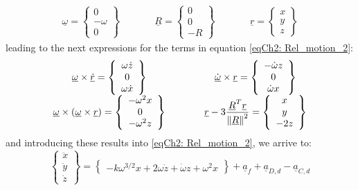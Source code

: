 	\[\begin{array}{ccccc}
	\underline{\omega} = 
	\left\{ \begin{array}{c}
	0 \\
	-\omega \\
	0
	\end{array}\right\} 
	& \qquad &
	\underline{R} = 
	\left\{ \begin{array}{c}
	0 \\
	0 \\
	-R
	\end{array}\right\} 
	& \qquad &
	\underline{r} = 
	\left\{ \begin{array}{c}
	x \\
	y \\
	z
	\end{array}\right\} 
	\end{array}
	\]
	\noindent leading to the next expressions for the terms in equation \eqref{eqCh2: 	Rel_motion_2}:
	\[\begin{array}{ccccc}
	\underline{\omega}\times \underline{\dot{r}} = 
	\left\{ \begin{array}{c}
	\omega \dot{z} \\
	0 \\
	\omega \dot{x}
	\end{array}\right\} 
	& \qquad &
	\underline{\dot{\omega}} \times \underline{r} = 
	\left\{ \begin{array}{c}
	-\dot{\omega} z\\
	0 \\
	\dot{\omega} x
	\end{array}\right\} 
	\\
	\underline{\omega}\times\left(\underline{\omega} \times\underline{r}\right) = 
	\left\{ \begin{array}{c}
	- \omega^2 x \\
	0 \\
	- \omega^2 z 
	\end{array}\right\} 
	& \qquad &
	\underline{r} - 3 \dfrac{\underline{R}^T \underline{r}}{\mbox{$\left\lVert \underline{R} \right\rVert$}^2} = 
	\left\{ \begin{array}{c}
	x \\
	y \\
	- 2 z 
	\end{array}\right\} 
	\end{array}
	\]
	\noindent and introducing these results into \eqref{eqCh2: 	Rel_motion_2}, we arrive to:
	\begin{equation}
	\left\{
	\begin{array}{c}
	\ddot{x}\\
	\ddot{y}\\
	\ddot{z}
	\end{array}\right\}
	= 
	\left\{
	\begin{array}{c}
	- k \omega^{3/2} x + 2\omega \dot{z} + \dot{\omega} z + \omega^2 x	
	\end{array}\right\}
	+ \underline{a}_f + \underline{a}_{D, d} - \underline{a}_{C, d}
	\label{eqCh2: Diff_eqs_prox}
	\end{equation}
